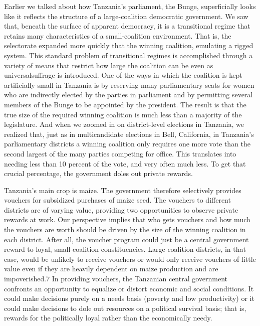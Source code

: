 \documentclass[10pt]{article}
\begin{document}
{\large Earlier we talked about how Tanzania's parliament, the Bunge,
superficially looks like it reflects the structure of a large-coalition
democratic government. We saw that, beneath the surface of apparent democracy, it
is a transitional regime that retains many characteristics of a small-coalition
environment. That is, the selectorate expanded more quickly that the winning
coalition, emulating a rigged system. This standard problem of transitional
regimes is accomplished through a variety of means that restrict how large the
coalition can be even as universalsuffrage is introduced. One of the ways in
which the coalition is kept artificially small in Tanzania is by reserving many
parliamentary seats for women who are indirectly elected by the parties in
parliament and by permitting several members of the Bunge to be appointed by the
president. The result is that the true size of the required winning coalition is
much less than a majority of the legislature. And when we zoomed in on
district-level elections in Tanzania, we realized that, just as in multicandidate
elections in Bell, California, in Tanzania's parliamentary districts a winning
coalition only requires one more vote than the second largest of the many parties
competing for office. This translates into needing less than 10 percent of the
vote, and very often much less. To get that crucial percentage, the government
doles out private rewards.}

{\large Tanzania's main crop is maize. The government therefore selectively
provides vouchers for subsidized purchases of maize seed. The vouchers to
different districts are of varying value, providing two opportunities to observe
private rewards at work. Our perspective implies that who gets vouchers and how
much the vouchers are worth should be driven by the size of the winning coalition
in each district. After all, the voucher program could just be a central
government reward to loyal, small-coalition constituencies. Large-coalition
districts, in that case, would be unlikely to receive vouchers or would only
receive vouchers of little value even if they are heavily dependent on maize
production and are impoverished.7 In providing vouchers, the Tanzanian central
government confronts an opportunity to equalize or distort economic and social
conditions. It could make decisions purely on a needs basis (poverty and low
productivity) or it could make decisions to dole out resources on a political
survival basis; that is, rewards for the politically loyal rather than the
economically needy.}
\end{document}
